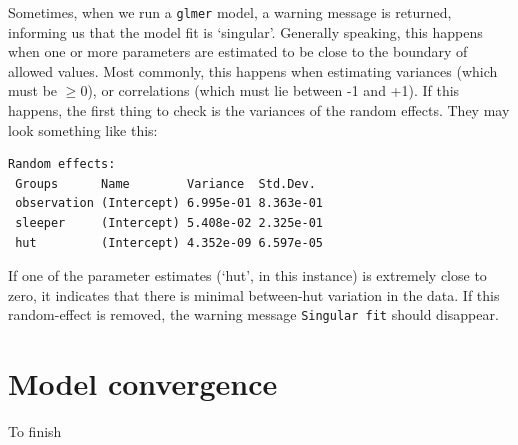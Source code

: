 \documentclass[11pt]{article}
\begin{document}
Sometimes, when we run a \verb+glmer+ model, a warning message is returned, informing us that the model fit is `singular'. Generally speaking, this happens when one or more parameters are estimated to be close to the boundary of allowed values. Most commonly, this happens when estimating variances (which must be $\geq0$), or correlations (which must lie between -1 and +1). If this happens, the first thing to check is the variances of the random effects. They may look something like this:
\begin{verbatim}
Random effects:
 Groups      Name        Variance  Std.Dev. 
 observation (Intercept) 6.995e-01 8.363e-01
 sleeper     (Intercept) 5.408e-02 2.325e-01
 hut         (Intercept) 4.352e-09 6.597e-05
\end{verbatim}
If one of the parameter estimates (`hut', in this instance) is extremely close to zero, it indicates that there is minimal between-hut variation in the data. If this random-effect is removed, the warning message \verb+Singular fit+ should disappear.

\section*{Model convergence}

To finish
\end{document}
